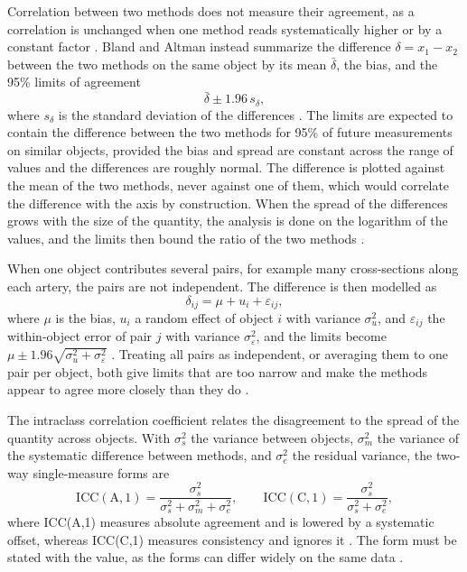 Correlation between two methods does not measure their agreement, as a correlation is unchanged when one method reads systematically higher or by a constant factor \cite{bland1986agreement}.
Bland and Altman instead summarize the difference $\delta = x_1 - x_2$ between the two methods on the same object by its mean $\bar{\delta}$, the bias, and the 95\% limits of agreement
\begin{equation}
  \bar{\delta} \pm 1.96\, s_\delta ,
  \label{eq:tech-loa}
\end{equation}
where $s_\delta$ is the standard deviation of the differences \cite{bland1986agreement}.
The limits are expected to contain the difference between the two methods for 95\% of future measurements on similar objects, provided the bias and spread are constant across the range of values and the differences are roughly normal.
The difference is plotted against the mean of the two methods, never against one of them, which would correlate the difference with the axis by construction.
When the spread of the differences grows with the size of the quantity, the analysis is done on the logarithm of the values, and the limits then bound the ratio of the two methods \cite{bland1999measuring}.

When one object contributes several pairs, for example many cross-sections along each artery, the pairs are not independent.
The difference is then modelled as
\begin{equation}
  \delta_{ij} = \mu + u_i + \varepsilon_{ij} ,
  \label{eq:tech-loa-repeated}
\end{equation}
where $\mu$ is the bias, $u_i$ a random effect of object $i$ with variance $\sigma_u^2$, and $\varepsilon_{ij}$ the within-object error of pair $j$ with variance $\sigma_\varepsilon^2$, and the limits become $\mu \pm 1.96\sqrt{\sigma_u^2 + \sigma_\varepsilon^2}$ \cite{bland2007agreement}.
Treating all pairs as independent, or averaging them to one pair per object, both give limits that are too narrow and make the methods appear to agree more closely than they do \cite{bland2007agreement}.

The intraclass correlation coefficient relates the disagreement to the spread of the quantity across objects.
With $\sigma_s^2$ the variance between objects, $\sigma_m^2$ the variance of the systematic difference between methods, and $\sigma_e^2$ the residual variance, the two-way single-measure forms are
\begin{equation}
  \mathrm{ICC(A,1)} = \frac{\sigma_s^2}{\sigma_s^2 + \sigma_m^2 + \sigma_e^2} ,
  \qquad
  \mathrm{ICC(C,1)} = \frac{\sigma_s^2}{\sigma_s^2 + \sigma_e^2} ,
  \label{eq:tech-icc}
\end{equation}
where ICC(A,1) measures absolute agreement and is lowered by a systematic offset, whereas ICC(C,1) measures consistency and ignores it \cite{mcgraw1996icc}.
The form must be stated with the value, as the forms can differ widely on the same data \cite{koo2016icc}.


